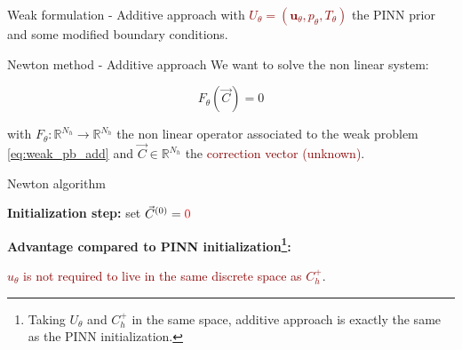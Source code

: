 \begin{frame}{Weak formulation - Additive approach}
    \vspace{5pt}
    with \textcolor{darkred}{$U_\theta = (\bm{u}_\theta, p_\theta, T_\theta)$} the PINN prior and some modified boundary conditions.
\end{frame}

\begin{frame}{Newton method - Additive approach}
    \vspace{-5pt}
    We want to solve the non linear system: %

    \normalsize
    \vspace{-10pt}
    \begin{equation*}
        F_\theta(\vec{C}) = 0 
    \end{equation*}

    \vspace{-2pt}
    with $F_\theta:\mathbb{R}^{N_h} \to \mathbb{R}^{N_h}$ the non linear operator associated to the weak problem \eqref{eq:weak_pb_add} and $\vec{C}\in \mathbb{R}^{N_h}$ the \textcolor{darkred}{correction vector (unknown)}.

	\setcounter{algocf}{1}
    \begin{center}
        \small
        \begin{minipage}{0.9\linewidth}
            \begin{algorithm}[H]
                \SetAlgoLined
                \caption{Newton algorithm \citep{newton_accel_2025}}
                \textbf{Initialization step:} set $\vec{C}^{(0)} = \textcolor{darkred}{0}$\;
            \end{algorithm}
        \end{minipage}
    \end{center}
    
    \vspace{3pt}
    \textbf{Advantage compared to PINN initialization\footnote[frame,1]{Taking $U_\theta$ and $C_h^+$ in the same space, additive approach is exactly the same as the PINN initialization.}:} %

    \vspace{-2pt}
    \begin{center}
        \textcolor{darkred}{$u_\theta$ is not required to live in the same discrete space as $C_h^+$}.
    \end{center}
    \vspace{8pt}
\end{frame}